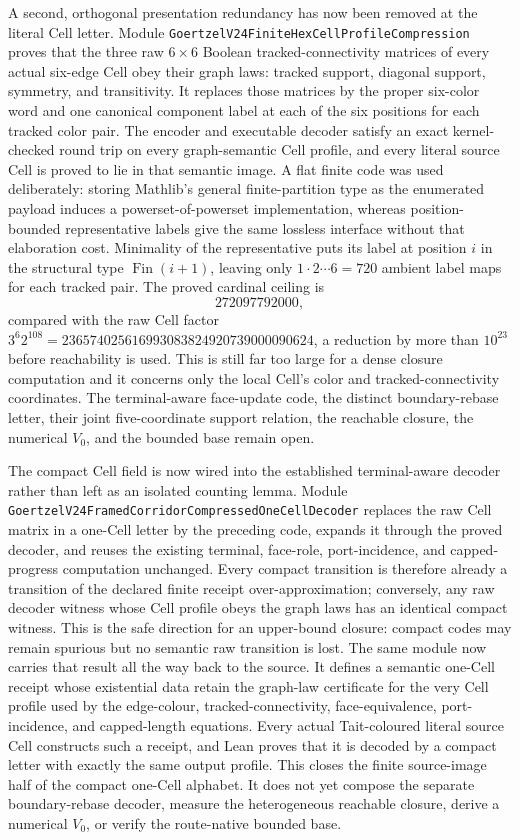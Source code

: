\documentclass[11pt]{article}
\theoremstyle{definition}
\begin{document}
A second, orthogonal presentation redundancy has now been removed at the
literal Cell letter.  Module
\texttt{GoertzelV24FiniteHexCellProfileCompression} proves that the three
raw $6\times6$ Boolean tracked-connectivity matrices of every actual
six-edge Cell obey their graph laws: tracked support, diagonal support,
symmetry, and transitivity.  It replaces those matrices by the proper
six-color word and one canonical component label at each of the six positions
for each tracked color pair.  The encoder and executable decoder satisfy an
exact kernel-checked round trip on every graph-semantic Cell profile, and
every literal source Cell is proved to lie in that semantic image.  A flat
finite code was used deliberately: storing Mathlib's general finite-partition
type as the enumerated payload induces a powerset-of-powerset implementation,
whereas position-bounded representative labels give the same lossless
interface without that elaboration cost.  Minimality of the representative
puts its label at position $i$ in the structural type
$\operatorname{Fin}(i+1)$, leaving only $1\cdot2\cdots6=720$ ambient label
maps for each tracked pair.  The proved cardinal ceiling is
\[
  272097792000,
\]
compared with the raw Cell factor
$3^6 2^{108}=236574025616993083824920739000090624$, a reduction by more
than $10^{23}$ before reachability is used.  This is still far too large for
a dense closure computation and it concerns only the local Cell's color and
tracked-connectivity coordinates.  The terminal-aware face-update code, the
distinct boundary-rebase letter, their joint five-coordinate support
relation, the reachable closure, the numerical $V_0$, and the bounded base
remain open.

The compact Cell field is now wired into the established terminal-aware
decoder rather than left as an isolated counting lemma.  Module
\texttt{GoertzelV24FramedCorridorCompressedOneCellDecoder} replaces the raw
Cell matrix in a one-Cell letter by the preceding code, expands it through the
proved decoder, and reuses the existing terminal, face-role, port-incidence,
and capped-progress computation unchanged.  Every compact transition is
therefore already a transition of the declared finite receipt
over-approximation; conversely, any raw decoder witness whose Cell profile
obeys the graph laws has an identical compact witness.  This is the safe
direction for an upper-bound closure: compact codes may remain spurious but
no semantic raw transition is lost.  The same module now carries that result
all the way back to the source.  It defines a semantic one-Cell receipt whose
existential data retain the graph-law certificate for the very Cell profile
used by the edge-colour, tracked-connectivity, face-equivalence,
port-incidence, and capped-length equations.  Every actual Tait-coloured
literal source Cell constructs such a receipt, and Lean proves that it is
decoded by a compact letter with exactly the same output profile.  This closes
the finite source-image half of the compact one-Cell alphabet.  It does not
yet compose the separate boundary-rebase decoder, measure the heterogeneous
reachable closure, derive a numerical $V_0$, or verify the route-native
bounded base.
\end{document}
